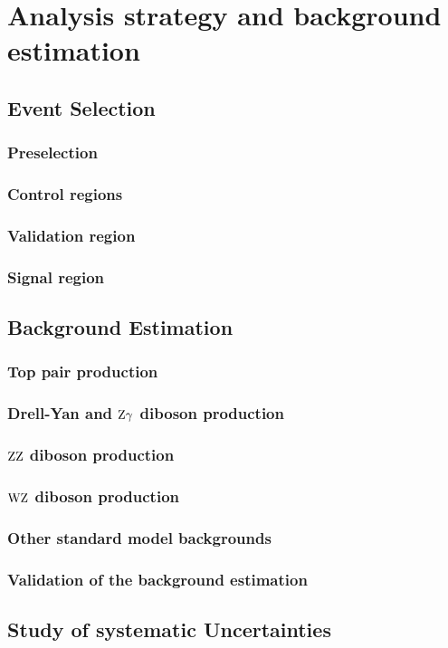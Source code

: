 \chapter{Analysis strategy and background estimation}\label{chap:analysis}
\section{Event Selection}
\subsection{Preselection}
\subsection{Control regions}
\subsection{Validation region}
\subsection{Signal region}
\section{Background Estimation}
\subsection{Top pair production}
\subsection{Drell-Yan and $\mathrm{Z}\gamma$ diboson production}
\subsection{$\mathrm{Z}\mathrm{Z}$ diboson production}
\subsection{$\mathrm{W}\mathrm{Z}$ diboson production}
\subsection{Other standard model backgrounds}
\subsection{Validation of the background estimation}
\section{Study of systematic Uncertainties}
